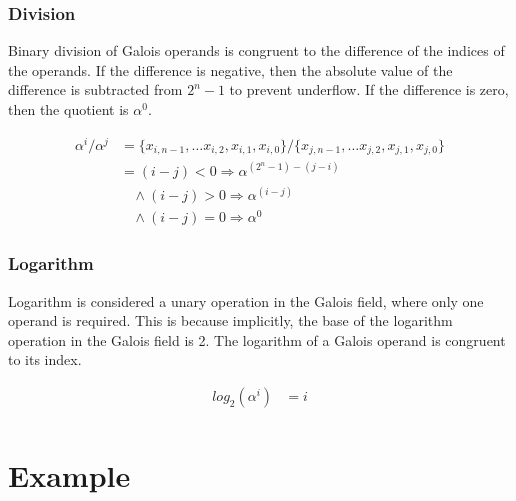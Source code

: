 \documentclass[11pt]{extarticle}
\begin{document}
            \subsubsection{Division} Binary division of Galois operands is
            congruent to the difference of the indices of the operands. If the
            difference is negative, then the absolute value of the difference
            is subtracted from $2^{n}-1$ to prevent underflow. If the
            difference is zero, then the quotient is $\alpha^{0}$.

                \begin{equation*}
                    \begin{split}
                        \alpha^{i} / \alpha^{j} & = \{x_{i, n-1},\ldots x_{i,
                        2},x_{i, 1},x_{i, 0}\} / \{x_{j, n-1}, \ldots x_{j, 2},
                        x_{j, 1}, x_{j, 0}\} \\ & = (i - j) < 0 \Longrightarrow
                        \alpha^{(2^{n}-1) - (j - i)} \\ & \ \ \ \ \wedge (i -
                        j) > 0 \Longrightarrow \alpha^{(i - j)} \\ & \ \ \ \
                        \wedge (i - j) = 0 \Longrightarrow \alpha^{0}
                    \end{split}
                \end{equation*}

            \subsubsection{Logarithm} Logarithm is considered a unary operation
            in the Galois field, where only one operand is required. This is
            because implicitly, the base of the logarithm operation in the
            Galois field is 2. The logarithm of a Galois operand is congruent
            to its index.

                \begin{equation*}
                    \begin{split} log_{2}(\alpha^{i}) & = i \\
                    \end{split}
                \end{equation*}
            \newpage

    \section{Example}
\end{document}
